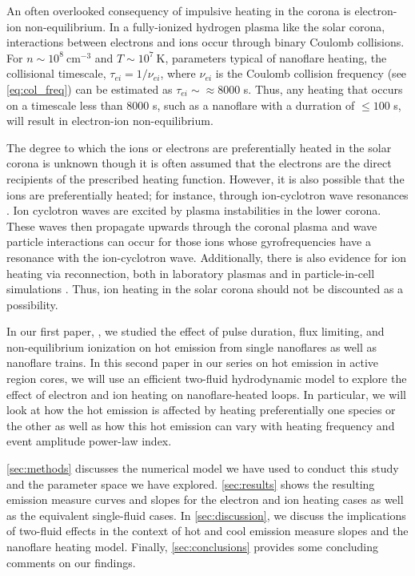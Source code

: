 \documentclass[tighten,apj]{emulateapj}
\begin{document}
	\par An often overlooked consequency of impulsive heating in the corona is electron-ion non-equilibrium. In a fully-ionized hydrogen plasma like the solar corona, interactions between electrons and ions occur through binary Coulomb collisions. For $n\sim10^8~\mathrm{cm}^{-3}$ and $T\sim10^7~\mathrm{K}$, parameters typical of nanoflare heating, the collisional timescale, $\tau_{ei}=1/\nu_{ei}$, where $\nu_{ei}$ is the Coulomb collision frequency (see \autoref{eq:col_freq}) can be estimated as $\tau_{ei}\sim\approx8000$ s. Thus, any heating that occurs on a timescale less than 8000 s, such as a nanoflare with a durration of $\le100$ s, will result in electron-ion non-equilibrium. 
	\par The degree to which the ions or electrons are preferentially heated in the solar corona is unknown though it is often assumed that the electrons are the direct recipients of the prescribed heating function. However, it is also possible that the ions are preferentially heated; for instance, through ion-cyclotron wave resonances \citep{markovskii_intermittent_2004}. Ion cyclotron waves are excited by plasma instabilities in the lower corona. These waves then propagate upwards through the coronal plasma and wave particle interactions can occur for those ions whose gyrofrequencies have a resonance with the ion-cyclotron wave. Additionally, there is also evidence for ion heating via reconnection, both in laboratory plasmas and in particle-in-cell simulations \citep{ono_ion_1996,yoo_bulk_2014,drake_onset_2014}. Thus, ion heating in the solar corona should not be discounted as a possibility.
	\par In our first paper, \citet{cargill_hot_2016}, we studied the effect of pulse duration, flux limiting, and non-equilibrium ionization on hot emission from single nanoflares as well as nanoflare trains. In this second paper in our series on hot emission in active region cores, we will use an efficient two-fluid hydrodynamic model to explore the effect of electron and ion heating on nanoflare-heated loops. In particular, we will look at how the hot emission is affected by heating preferentially one species or the other as well as how this hot emission can vary with heating frequency and event amplitude power-law index. 
	\par\autoref{sec:methods} discusses the numerical model we have used to conduct this study and the parameter space we have explored. \autoref{sec:results} shows the resulting emission measure curves and slopes for the electron and ion heating cases as well as the equivalent single-fluid cases. In \autoref{sec:discussion}, we discuss the implications of two-fluid effects in the context of hot and cool emission measure slopes and the nanoflare heating model. Finally, \autoref{sec:conclusions} provides some concluding comments on our findings.
\end{document}
